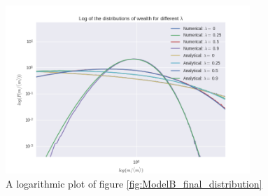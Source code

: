\documentclass[a4paper, 10pt]{article}
\begin{document}
\begin{figure}[!ht]
\centering
\includegraphics[height=2.5in]{logDistDiffLamb.png} %
\caption{A logarithmic plot of figure \ref{fig:ModelB_final_distribution}}\label{fig:ModelB_final_distribution_log}
\end{figure}
\end{document}
